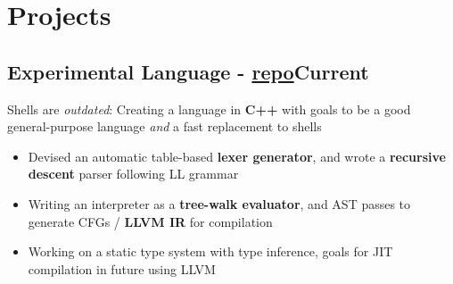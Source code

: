 \documentclass[9pt]{article}
\begin{document}
\section*{Projects}



\subsection{Experimental Language \normalsize\textnormal{- \href{https://github.com/ianayl/compiler}{repo}}\hfill \normalsize\textnormal{Current}}
Shells are \textit{outdated}: Creating a language in \textbf{C++} with goals to be a good general-purpose language \textit{and} a fast replacement to shells
\vspace{-0.5em}
\begin{itemize}
  \item Devised an automatic table-based \textbf{lexer generator}, and wrote a \textbf{recursive descent} parser following LL grammar
  \item Writing an interpreter as a \textbf{tree-walk evaluator}, and AST passes to generate CFGs / \textbf{LLVM IR} for compilation
  \item Working on a static type system with type inference, goals for JIT compilation in future using LLVM
\end{itemize}
\end{document}
